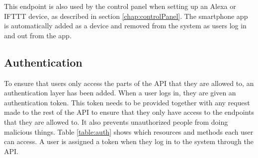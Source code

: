 This endpoint is also used by the control panel when setting up an Alexa or IFTTT device, as described in section \ref{chap:controlPanel}. The smartphone app is automatically added as a device and removed from the system as users log in and out from the app. 

\subsection{Authentication}\label{sec:authentication}
To ensure that users only access the parts of the API that they are allowed to, an authentication layer has been added. When a user logs in, they are given an authentication token. This token needs to be provided together with any request made to the rest of the API to ensure that they only have access to the endpoints that they are allowed to. It also prevents unauthorized people from doing malicious things. Table \ref{table:auth} shows which resources and methods each user can access. A user is assigned a token when they log in to the system through the API.

